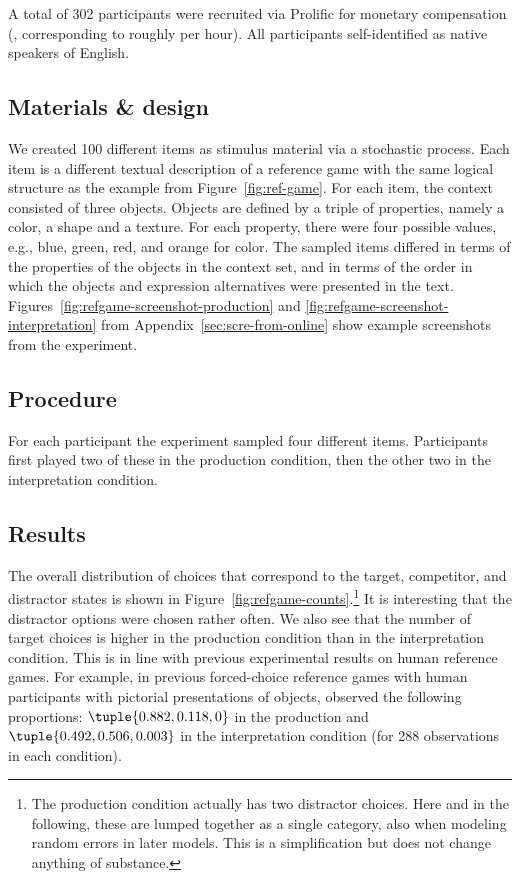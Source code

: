 \documentclass[fleqn]{article}
\begin{document}
A total of 302 participants were recruited via Prolific for monetary
compensation (, corresponding to roughly  per hour).
All participants self-identified as native speakers of English.

\subsection{Materials \& design}
\label{materials-design}

We created 100 different items as stimulus material via a stochastic process.
Each item is a different textual description of a reference game with the same logical structure as the example from Figure~\ref{fig:ref-game}.
For each item, the context consisted of three objects.
Objects are defined by a triple of properties, namely a color, a shape and a texture.
For each property, there were four possible values, e.g., blue, green, red, and orange for color.
The sampled items differed in terms of the properties of the objects in the context set, and in terms of the order in which the objects and expression alternatives were presented in the text.
Figures~\ref{fig:refgame-screenshot-production} and \ref{fig:refgame-screenshot-interpretation} from Appendix~\ref{sec:scre-from-online} show example screenshots from the experiment.

\subsection{Procedure}
\label{procedure}

For each participant the experiment sampled four different items.
Participants first played two of these in the production condition, then the other two in the interpretation condition.


\subsection{Results}\label{results}

The overall distribution of choices that correspond to the target, competitor, and distractor states is shown in Figure~\ref{fig:refgame-counts}.\footnote{
  The production condition actually has two distractor choices.
  Here and in the following, these are lumped together as a single category, also when modeling random errors in later models.
  This is a simplification but does not change anything of substance.}
It is interesting that the distractor options were chosen rather often.
We also see that the number of target choices is higher in the production condition than in the interpretation condition.
This is in line with previous experimental results on human reference games.
For example, in previous forced-choice reference games with human participants with pictorial presentations of objects, \citet{QingFranke2013:Variations-on-a} observed the following proportions: $\tuple{0.882, 0.118, 0}$ in the production and $\tuple{0.492, 0.506, 0.003}$ in the interpretation condition (for 288 observations in each condition).
\end{document}
